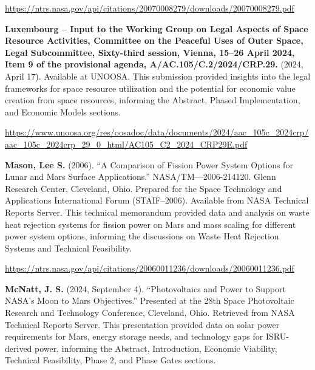 \documentclass[fontsize=10pt, oneside, DIV=calc]{scrartcl}
\begin{document}
\href{https://ntrs.nasa.gov/api/citations/20070008279/downloads/20070008279.pdf}{\url{https://ntrs.nasa.gov/api/citations/20070008279/downloads/20070008279.pdf}}

\vspace{1em}
\noindent \textbf{Luxembourg – Input to the Working Group on Legal Aspects of Space Resource Activities, Committee on the Peaceful Uses of Outer Space, Legal Subcommittee, Sixty-third session, Vienna, 15–26 April 2024, Item 9 of the provisional agenda, A/AC.105/C.2/2024/CRP.29.} (2024, April 17). Available at UNOOSA. This submission provided insights into the legal frameworks for space resource utilization and the potential for economic value creation from space resources, informing the Abstract, Phased Implementation, and Economic Models sections. 



\href{https://www.unoosa.org/res/oosadoc/data/documents/2024/aac\_105c\_22024crp/aac\_105c\_2024crp\_29\_0\_html/AC105\_C2\_2024\_CRP29E.pdf}{\url{https://www.unoosa.org/res/oosadoc/data/documents/2024/aac\_105c\_2024crp/aac\_105c\_2024crp\_29\_0\_html/AC105\_C2\_2024\_CRP29E.pdf}}

\vspace{1em}
\noindent \textbf{Mason, Lee S.} (2006). ``A Comparison of Fission Power System Options for Lunar and Mars Surface Applications.'' NASA/TM—2006-214120. Glenn Research Center, Cleveland, Ohio. Prepared for the Space Technology and Applications International Forum (STAIF–2006). Available from NASA Technical Reports Server. This technical memorandum provided data and analysis on waste heat rejection systems for fission power on Mars and mass scaling for different power system options, informing the discussions on Waste Heat Rejection Systems and Technical Feasibility. 



\href{https://ntrs.nasa.gov/api/citations/20060011236/downloads/20060011236.pdf}{\url{https://ntrs.nasa.gov/api/citations/20060011236/downloads/20060011236.pdf}}

\vspace{1em}
\noindent \textbf{McNatt, J. S.} (2024, September 4). ``Photovoltaics and Power to Support NASA’s Moon to Mars Objectives.'' Presented at the 28th Space Photovoltaic Research and Technology Conference, Cleveland, Ohio. Retrieved from NASA Technical Reports Server. This presentation provided data on solar power requirements for Mars, energy storage needs, and technology gaps for ISRU-derived power, informing the Abstract, Introduction, Economic Viability, Technical Feasibility, Phase 2, and Phase Gates sections. 
\end{document}
